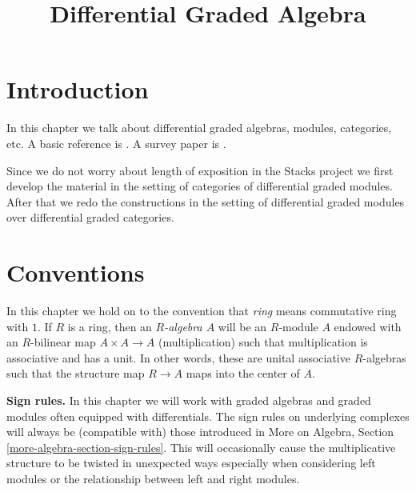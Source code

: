 \documentclass{stacks-project}
\theoremstyle{plain}
\theoremstyle{definition}
\theoremstyle{remark}
\numberwithin{equation}{subsection}
\begin{document}
\title{Differential Graded Algebra}


\maketitle

\label{section-phantom}

\tableofcontents

\section{Introduction}
\label{section-introduction}

\noindent
In this chapter we talk about differential graded algebras, modules,
categories, etc. A basic reference is \cite{Keller-Deriving}.
A survey paper is \cite{Keller-survey}.

\medskip\noindent
Since we do not worry about length of exposition in the Stacks project
we first develop the material in the setting of categories of differential
graded modules. After that we redo the constructions in the setting of
differential graded modules over differential graded categories.



\section{Conventions}
\label{section-conventions}

\noindent
In this chapter we hold on to the convention that {\it ring} means
commutative ring with $1$. If $R$ is a ring, then an {\it $R$-algebra $A$}
will be an $R$-module $A$ endowed with an $R$-bilinear map $A \times A \to A$
(multiplication) such that multiplication is associative and has a unit.
In other words, these are unital associative $R$-algebras
such that the structure map $R \to A$ maps into the center of $A$.

\medskip\noindent
{\bf Sign rules.} In this chapter we will work with graded algebras
and graded modules often equipped with differentials. The sign rules on
underlying complexes will always be (compatible with) those introduced in
More on Algebra, Section \ref{more-algebra-section-sign-rules}.
This will occasionally cause the multiplicative structure to be
twisted in unexpected ways especially when considering left modules
or the relationship between left and right modules.
\end{document}
